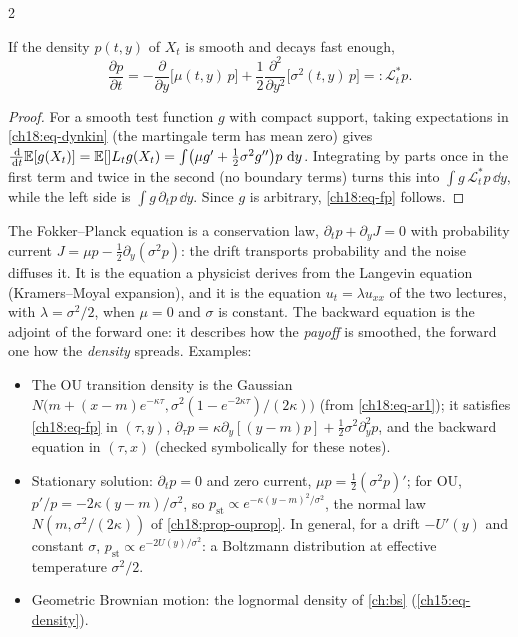 \begin{paracol}{2}
\begin{proposition}\label{ch18:prop-fp}
If the density $p(t,y)$ of $X_t$ is smooth and decays fast enough,
\begin{equation}\label{ch18:eq-fp}
  \frac{\partial p}{\partial t}=-\frac{\partial}{\partial y}\bigl[\mu(t,y)\,p\bigr]+\frac12\frac{\partial^2}{\partial y^2}\bigl[\sigma^2(t,y)\,p\bigr]=:\mathcal L_t^*p .
\end{equation}
\end{proposition}
\begin{proof}
For a smooth test function $g$ with compact support, taking expectations in \eqref{ch18:eq-dynkin} (the martingale term has mean zero) gives $\frac{\,\mathrm{d}}{\,\mathrm{d} t}\mathbb{E}[g(X_t)]=\mathbb{E}[\mathcal] L_tg(X_t)=\int\bigl(\mu g'+\tfrac12\sigma^2g''\bigr)p\,\,\mathrm{d} y$. Integrating by parts once in the first term and twice in the second (no boundary terms) turns this into $\int g\,\mathcal L_t^*p\,\dd y$, while the left side is $\int g\,\partial_tp\,\dd y$. Since $g$ is arbitrary, \eqref{ch18:eq-fp} follows.
\end{proof}
The Fokker--Planck equation is a conservation law, $\partial_tp+\partial_yJ=0$ with probability current $J=\mu p-\tfrac12\partial_y(\sigma^2p)$: the drift transports probability and the noise diffuses it. It is the equation a physicist derives from the Langevin equation (Kramers--Moyal expansion), and it is the equation $u_t=\lambda u_{xx}$ of the two lectures, with $\lambda=\sigma^2/2$, when $\mu=0$ and $\sigma$ is constant. The backward equation is the adjoint of the forward one: it describes how the \emph{payoff} is smoothed, the forward one how the \emph{density} spreads. Examples:
\begin{itemize}
  \item The OU transition density is the Gaussian $N\bigl(m+(x-m)e^{-\kappa\tau},\sigma^2(1-e^{-2\kappa\tau})/(2\kappa)\bigr)$ (from \eqref{ch18:eq-ar1}); it satisfies \eqref{ch18:eq-fp} in $(\tau,y)$, $\partial_\tau p=\kappa\partial_y[(y-m)p]+\tfrac12\sigma^2\partial_y^2p$, and the backward equation in $(\tau,x)$ (checked symbolically for these notes).
  \item Stationary solution: $\partial_tp=0$ and zero current, $\mu p=\tfrac12(\sigma^2p)'$; for OU, $p'/p=-2\kappa(y-m)/\sigma^2$, so $p_{\mathrm{st}}\propto e^{-\kappa(y-m)^2/\sigma^2}$, the normal law $N(m,\sigma^2/(2\kappa))$ of \cref{ch18:prop-ouprop}. In general, for a drift $-U'(y)$ and constant $\sigma$, $p_{\mathrm{st}}\propto e^{-2U(y)/\sigma^2}$: a Boltzmann distribution at effective temperature $\sigma^2/2$.
  \item Geometric Brownian motion: the lognormal density of \cref{ch:bs} (\cref{ch15:eq-density}).
\end{itemize}


\end{paracol}
